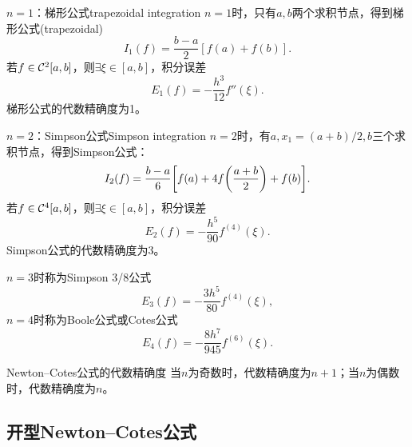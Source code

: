 \begin{example}
    {$n = 1$：梯形公式}{trapezoidal integration}
    $n = 1$时，只有$a,b$两个求积节点，得到梯形公式(trapezoidal)
    \begin{equation}
        \label{eqn:trapezoidal integration}
        I_1(f) = \frac{b - a}2[f(a) + f(b)].
    \end{equation}
    若$f \in \mathcal{C}^2[a,b]$，则$\exists\xi \in [a,b]$，积分误差
    \begin{equation}
        \label{eqn:trapezoidal error}
        E_1(f) = -\frac{h^3}{12}f''(\xi).
    \end{equation}
    梯形公式的代数精确度为1。
\end{example}

\begin{example}
    {$n = 2$：Simpson公式}{Simpson integration}
    $n = 2$时，有$a,x_1 = (a + b)/2,b$三个求积节点，得到Simpson公式：
    \begin{equation}
        \label{eqn:Simpson integration}
        I_2(f) = \frac{b - a}6\biggl[f(a) + 4f\biggl(\frac{a + b}2\biggr) + f(b)\biggr].
    \end{equation}
    若$f \in \mathcal{C}^4[a,b]$，则$\exists\xi \in [a,b]$，积分误差
    \begin{equation}
        \label{eqn:Simpson error}
        E_2(f) = -\frac{h^5}{90}f^{(4)}(\xi).
    \end{equation}
    Simpson公式的代数精确度为3。
\end{example}

\begin{remark}
    $n = 3$时称为Simpson 3/8公式
    \begin{equation}\label{eq:na-simpson-three-eighths-error}
        E_3(f) = -\frac{3h^5}{80}f^{(4)}(\xi),
    \end{equation}
    $n = 4$时称为Boole公式或Cotes公式
    \begin{equation}\label{eq:na-boole-error}
        E_4(f) = -\frac{8h^7}{945}f^{(6)}(\xi).
    \end{equation}
\end{remark}

\begin{theorem}
    {Newton--Cotes公式的代数精确度}{}
    当$n$为奇数时，代数精确度为$n + 1$；当$n$为偶数时，代数精确度为$n$。
\end{theorem}

\subsection{开型Newton--Cotes公式}

